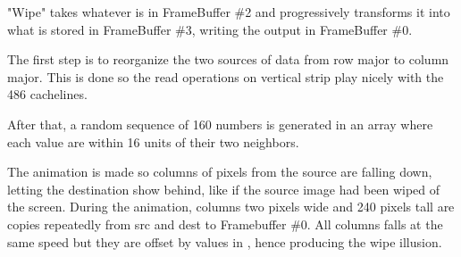 \par
"Wipe" takes whatever is in FrameBuffer \#2 and progressively transforms it into what is stored in FrameBuffer \#3, writing the output in FrameBuffer \#0.\\%
\par
The first step is to reorganize the two sources of data from row major to column major. This is done so the read operations on vertical strip play nicely with the 486 cachelines.\\
\par
{}
\par
After that, a random sequence of 160 numbers is generated in an array  where each value are within 16 units of their two neighbors.\\
\par The animation is made so columns of pixels from the source are falling down, letting the destination show behind, like if the source image had been wiped of the screen. During the animation, columns two pixels wide and 240 pixels tall are copies repeatedly from src and dest to Framebuffer \#0. All columns falls at the same speed but they are offset by values in , hence producing the wipe illusion.




